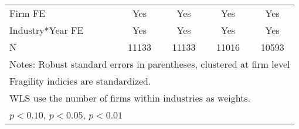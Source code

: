\begin{table}[htbp]
\begin{tabular}{l*{4}{c}}
Firm FE             &         Yes         &         Yes         &         Yes         &         Yes         \\
Industry*Year FE    &         Yes         &         Yes         &         Yes         &         Yes         \\
N                   &       11133         &       11133         &       11016         &       10593         \\
\bottomrule
\multicolumn{5}{l}{\footnotesize Notes: Robust standard errors in parentheses, clustered at firm level}\\
\multicolumn{5}{l}{\footnotesize Fragility indicies are standardized.}\\
\multicolumn{5}{l}{\footnotesize WLS use the number of firms within industries as weights.}\\
\multicolumn{5}{l}{\footnotesize \sym{*} \(p<0.10\), \sym{**} \(p<0.05\), \sym{***} \(p<0.01\)}\\
\end{tabular}
\end{table}
